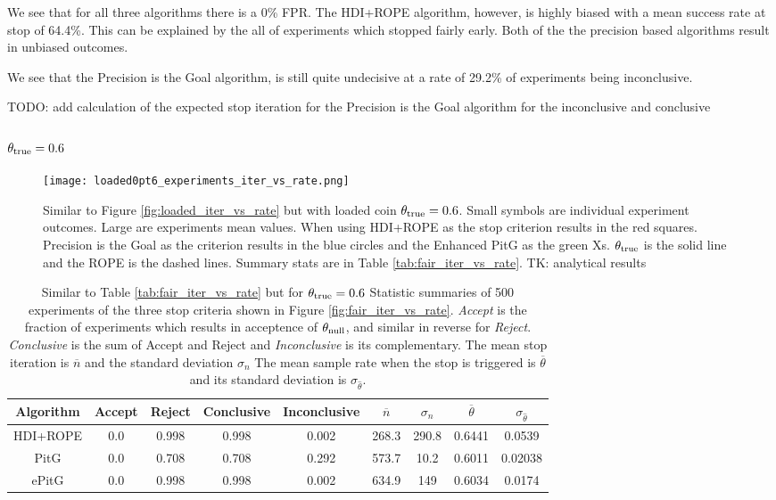 We see that for all three algorithms there is a 0\% FPR.
The HDI+ROPE algorithm, however, is highly biased with a mean
success rate at stop of 64.4\%. This can be explained by the all of experiments
which stopped fairly early. Both of the the precision based algorithms result in
unbiased outcomes.

We see that the Precision is the Goal algorithm, is still quite undecisive at a rate of 29.2\%
of experiments being inconclusive.

TODO: add calculation of the expected stop iteration for the Precision is the Goal algorithm for the 
inconclusive and conclusive

\subsubsection{$\theta_{\rm true}=0.6$}

\begin{figure}[h!]
  \centering
  \texttt{[image: loaded0pt6\_experiments\_iter\_vs\_rate.png]}
  \caption{Similar to Figure \ref{fig:loaded_iter_vs_rate} but with
  loaded coin $\theta_{\rm true}=0.6$.
  Small symbols are individual experiment outcomes. Large are experiments
  mean values. When using HDI+ROPE as the stop criterion results in the red squares.
  Precision is the Goal as the criterion results in the blue circles
  and the Enhanced PitG as the green Xs. $\theta_{\rm true}$ is the solid line and
  the ROPE is the dashed lines. Summary stats are in Table \ref{tab:fair_iter_vs_rate}. TK: analytical results
  }
  \label{fig:loaded0pt6_iter_vs_rate}
\end{figure}


\begin{table}[h!]\label{tab:loaded0pt6_iter_vs_rate}
  \begin{center}
  \begin{tabular}{c|c|c|c|c|c|c|c|c}
    \hline
    Algorithm & Accept & Reject & Conclusive & Inconclusive & $\overline{n}$ & $\sigma_n$ & $\overline{\theta}$ & $\sigma_{\hat{\theta}}$\\
    \hline
    HDI+ROPE & 0.0	& 0.998	& 0.998 &	0.002	& 268.3 &	290.8 & 0.6441 &	0.0539 \\
    PitG & 0.0 &	0.708 &	0.708 &	0.292	& 573.7	& 10.2 &	0.6011 &	0.02038 \\
    ePitG & 0.0	& 0.998	& 0.998	& 0.002	& 634.9	& 149	& 0.6034	 & 0.0174 \\
    \hline
  \end{tabular}
  \caption{Similar to Table \ref{tab:fair_iter_vs_rate} but for $\theta_{\rm true}=0.6$ Statistic summaries of 500 experiments of the three stop criteria shown in
  Figure \ref{fig:fair_iter_vs_rate}. {\it Accept}
  is the fraction of experiments which results in acceptence of $\theta_{\rm null}$,
  and similar in reverse for {\it Reject}. {\it Conclusive} is the sum of Accept
  and Reject and {\it Inconclusive} is its complementary.
  The mean stop iteration is $\overline{n}$ and the standard deviation $\sigma_n$
  The mean sample rate when the stop is triggered is $\overline{\theta}$ and its standard deviation is $\sigma_{\hat{\theta}}$.
  }
\end{center}
\end{table}

